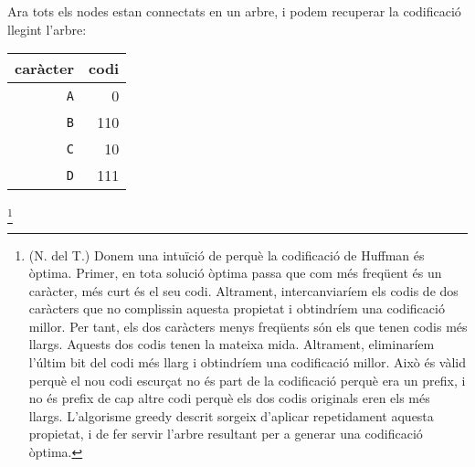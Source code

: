 Ara tots els nodes estan connectats en un arbre, i
podem recuperar la codificació llegint l'arbre:
\begin{center}
\begin{tabular}{rr}
caràcter & codi \\
\hline
\texttt{A} & 0 \\
\texttt{B} & 110 \\
\texttt{C} & 10 \\
\texttt{D} & 111 \\
\end{tabular}
\end{center}

\footnote{(N. del T.) Donem una intuïció de perquè la codificació de
Huffman és òptima.
Primer, en tota solució òptima passa que com més freqüent és un
caràcter, més curt és el seu codi. Altrament, intercanviaríem els codis
de dos caràcters que no complissin aquesta propietat i obtindríem una
codificació millor.
Per tant, els dos caràcters menys freqüents són els que tenen codis més llargs.
Aquests dos codis tenen la mateixa mida. Altrament, eliminaríem l'últim bit
del codi més llarg i obtindríem una codificació millor. Això és vàlid perquè el
nou codi escurçat no és part de la codificació perquè era un prefix, i no és
prefix de cap altre codi perquè els dos codis originals eren els més llargs. L'algorisme greedy descrit sorgeix d'aplicar repetidament aquesta propietat, i de fer servir l'arbre resultant per a generar una codificació òptima.}
